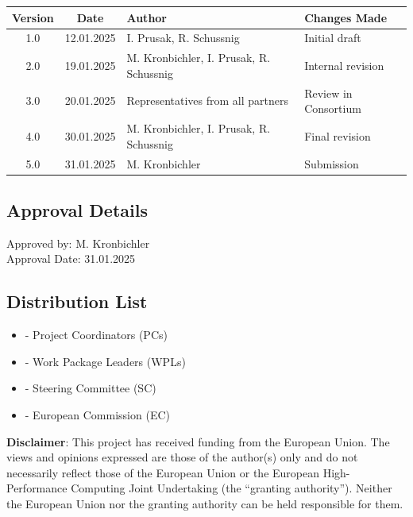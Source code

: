 \documentclass[a4paper,12pt]{article}
\begin{document}
\begin{center}
    \renewcommand{\arraystretch}{1.25}
    \small
    \begin{tabular}{|c|c|l|l|}
    \hline
    \textbf{Version} & \textbf{Date} & \textbf{Author} & \textbf{Changes Made} \\
    \hline
    1.0 & 12.01.2025 & I. Prusak, R. Schussnig & Initial draft \\
    2.0 & 19.01.2025 & M. Kronbichler, I. Prusak, R. Schussnig & Internal revision \\
    3.0 & 20.01.2025 & Representatives from all partners & Review in Consortium \\
    4.0 & 30.01.2025 & M. Kronbichler, I. Prusak, R. Schussnig & Final revision \\
    5.0 & 31.01.2025 & M. Kronbichler & Submission \\
    \hline
    \end{tabular}
\end{center}

\subsection*{\textcolor{EUblue}{Approval Details}}
Approved by: M. Kronbichler \\
Approval Date: 31.01.2025

\subsection*{\textcolor{EUblue}{Distribution List}}
\begin{itemize}
    \item [] - Project Coordinators (PCs)
    \item [] - Work Package Leaders (WPLs)
    \item [] - Steering Committee (SC)
    \item [] - European Commission (EC)
\end{itemize}


\vspace*{2cm}
\noindent \textbf{Disclaimer}: This project has received funding from the European Union. The views and opinions expressed are those of the author(s) only and do not necessarily reflect those of the European Union or the European High-Performance Computing Joint Undertaking (the “granting authority”). Neither the European Union nor the granting authority can be held responsible for them.
\end{document}
